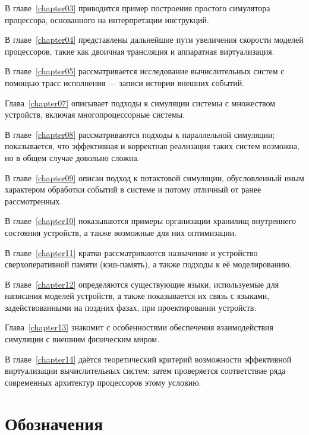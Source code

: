 В главе~\ref{chapter03} приводится пример построения простого симулятора процессора, основанного на интерпретации инструкций.

В главе~\ref{chapter04} представлены дальнейшие пути увеличения скорости моделей процессоров, такие как двоичная трансляция и аппаратная виртуализация.

В главе~\ref{chapter05} рассматривается исследование вычислительных систем с помощью трасс исполнения --- записи истории внешних событий.


Глава~\ref{chapter07} описывает подходы к симуляции системы с множеством устройств, включая многопроцессорные системы.

В главе~\ref{chapter08} рассматриваются подходы к параллельной симуляции; показывается, что эффективная и корректная реализация таких систем возможна, но в общем случае довольно сложна.

В главе~\ref{chapter09} описан подход к потактовой симуляции, обусловленный иным характером обработки событий в системе и потому отличный от ранее рассмотренных.

В главе~\ref{chapter10} показываются примеры организации хранилищ внутреннего состояния устройств, а также возможные для них оптимизации.

В главе~\ref{chapter11} кратко рассматриваются назначение и устройство сверхоперативной памяти (кэш-память), а также подходы к её моделированию.

В главе~\ref{chapter12} определяются существующие языки, используемые для написания моделей устройств, а также показывается их связь с языками, задействованными на поздних фазах, при проектировании устройств.

Глава~\ref{chapter13} знакомит с особенностями обеспечения взаимодействия симуляции с внешним физическим миром.

В главе~\ref{chapter14} даётся теоретический критерий возможности эффективной виртуализации вычислительных систем; затем проверяется соответствие ряда современных архитектур процессоров этому условию.


\newpage

\section*{Обозначения}


